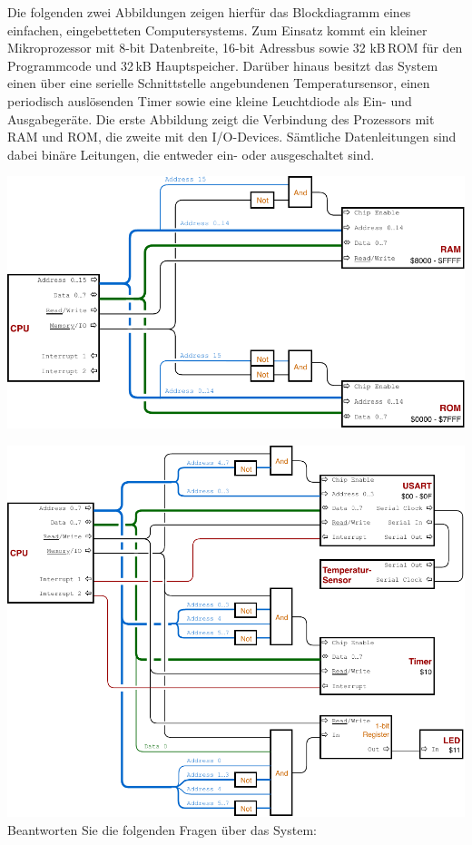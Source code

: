 Die folgenden zwei Abbildungen zeigen hierfür das Blockdiagramm eines einfachen,
eingebetteten Computersystems. Zum Einsatz kommt ein kleiner Mikroprozessor
mit 8-bit Datenbreite, 16-bit Adressbus sowie 32 kB\,ROM für den Programmcode
und 32\,kB Hauptspeicher. Darüber hinaus besitzt das System einen über eine
serielle Schnittstelle angebundenen Temperatursensor, einen periodisch
auslösenden Timer sowie eine kleine Leuchtdiode als Ein- und Ausgabegeräte.
Die erste Abbildung zeigt die Verbindung des Prozessors mit RAM und ROM, die
zweite mit den I/O-Devices. Sämtliche Datenleitungen sind dabei binäre Leitungen,
die entweder ein- oder ausgeschaltet sind.

\bigskip
\includegraphics[width=\textwidth]{01-grundlagen/img/aufgabe-rechnerarchitektur-1}

\includegraphics[width=\textwidth]{01-grundlagen/img/aufgabe-rechnerarchitektur-2}
\bigskip
Beantworten Sie die folgenden Fragen über das System:

